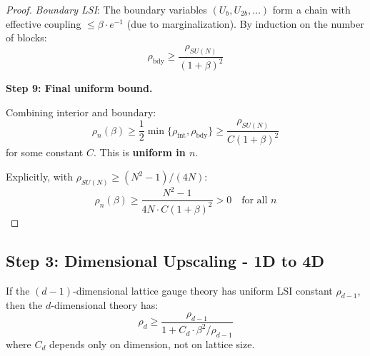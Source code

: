\begin{proof}
\textit{Boundary LSI}: The boundary variables $(U_b, U_{2b}, \ldots)$ form a chain 
with effective coupling $\leq \beta \cdot e^{-1}$ (due to marginalization). 
By induction on the number of blocks:
\[
\rho_{\text{bdy}} \geq \frac{\rho_{SU(N)}}{(1+\beta)^2}
\]

\textbf{Step 9: Final uniform bound.}

Combining interior and boundary:
\[
\rho_n(\beta) \geq \frac{1}{2}\min\{\rho_{\text{int}}, \rho_{\text{bdy}}\} 
\geq \frac{\rho_{SU(N)}}{C(1+\beta)^2}
\]
for some constant $C$. This is \textbf{uniform in $n$}.

Explicitly, with $\rho_{SU(N)} \geq (N^2-1)/(4N)$:
\[
\boxed{\rho_n(\beta) \geq \frac{N^2-1}{4N \cdot C(1+\beta)^2} > 0 \quad \text{for all } n}
\]
\end{proof}

\subsection{Step 3: Dimensional Upscaling - 1D to 4D}

\begin{theorem}
\label{thm:dimensional-induction}
If the $(d-1)$-dimensional lattice gauge theory has uniform LSI constant $\rho_{d-1}$, 
then the $d$-dimensional theory has:
\[
\rho_d \geq \frac{\rho_{d-1}}{1 + C_d \cdot \beta^2 / \rho_{d-1}}
\]
where $C_d$ depends only on dimension, not on lattice size.
\end{theorem}

